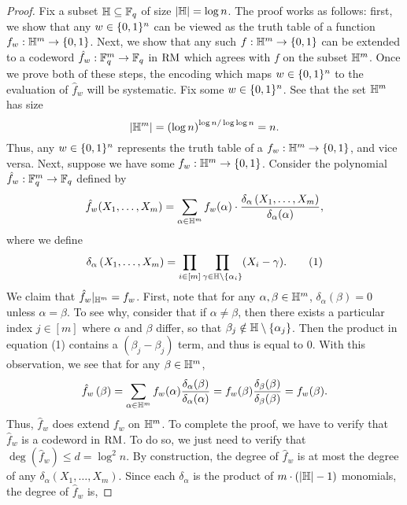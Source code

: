 \documentclass[11pt]{article}
\begin{document}
\begin{proof}
    Fix a subset $\mathbb{H} \subseteq \mathbb{F}_q$ of size $|\mathbb{H}| = \log n$. The proof works as follows: first, we show that any $w \in \{0, 1\}^n$ can be viewed as the truth table of a function $f_w : \mathbb{H}^m \rightarrow \{0, 1\}$. Next, we show that any such $f : \mathbb{H}^m \rightarrow \{0, 1\}$ can be extended to a codeword $\hat{f}_w : \mathbb{F}_q^m \rightarrow \mathbb{F}_q$ in $\mathrm{RM}$ which agrees with $f$ on the subset $\mathbb{H}^m$. Once we prove both of these steps, the encoding which maps $w \in \{0, 1\}^n$ to the evaluation of $\hat{f}_w$ will be systematic. Fix some $w \in \{0, 1\}^n$. See that the set $\mathbb{H}^m$ has size 
    \begin{equation*}
        |\mathbb{H}^m| = \left(\log n\right)^{\log n / \log \log n} = n.
    \end{equation*}
    Thus, any $w \in \{0, 1\}^n$ represents the truth table of a $f_w : \mathbb{H}^m \rightarrow \{0, 1\}$, and vice versa. Next, suppose we have some $f_w : \mathbb{H}^m \rightarrow \{0, 1\}$. Consider the polynomial $\hat{f}_w : \mathbb{F}_q^m \rightarrow \mathbb{F}_q$ defined by 
    \begin{equation*}
        \hat{f}_w(X_1, \ldots, X_m) = \sum_{\alpha \in \mathbb{H}^m} f_w(\alpha) \cdot \frac{\delta_\alpha \left(X_1, \ldots, X_m\right)}{\delta_\alpha(\alpha)},
    \end{equation*}
    where we define 
    \begin{equation*}
        \delta_\alpha \left(X_1, \ldots, X_m\right) = \prod_{i \in [m]} \prod_{\gamma \in \mathbb{H} \setminus \{\alpha_i\}} (X_i - \gamma). \tag{1}
    \end{equation*}
    We claim that $\hat{f}_w |_{\mathbb{H}^m} = f_w$. First, note that for any $\alpha, \beta \in \mathbb{H}^m$, $\delta_{\alpha}(\beta) = 0$ unless $\alpha = \beta$. To see why, consider that if $\alpha \neq \beta$, then there exists a particular index $j \in [m]$ where $\alpha$ and $\beta$ differ, so that $\beta_j \notin \mathbb{H} \setminus \{\alpha_j\}$. Then the product in equation (1) contains a $(\beta_j - \beta_j)$ term, and thus is equal to $0$. With this observation, we see that for any $\beta \in \mathbb{H}^m$, 
    \begin{equation*}
        \hat{f}_w \left(\beta\right) = \sum_{\alpha \in \mathbb{H}^m} f_w(\alpha) \frac{\delta_\alpha(\beta)}{\delta_{\alpha}(\alpha)} = f_w(\beta) \frac{\delta_\beta(\beta)}{\delta_\beta(\beta)} = f_w(\beta).
    \end{equation*}
    Thus, $\hat{f}_w$ does extend $f_w$ on $\mathbb{H}^m$. To complete the proof, we have to verify that $\hat{f}_w$ is a codeword in $\mathrm{RM}$. To do so, we just need to verify that $\deg(\hat{f}_w) \leq d = \log^2 n$. By construction, the degree of $\hat{f}_w$ is at most the degree of any $\delta_\alpha(X_1, \ldots, X_m)$. Since each $\delta_\alpha$ is the product of $m \cdot (|\mathbb{H}| - 1)$ monomials, the degree of $\hat{f}_w$ is,

\end{proof}
\end{document}
